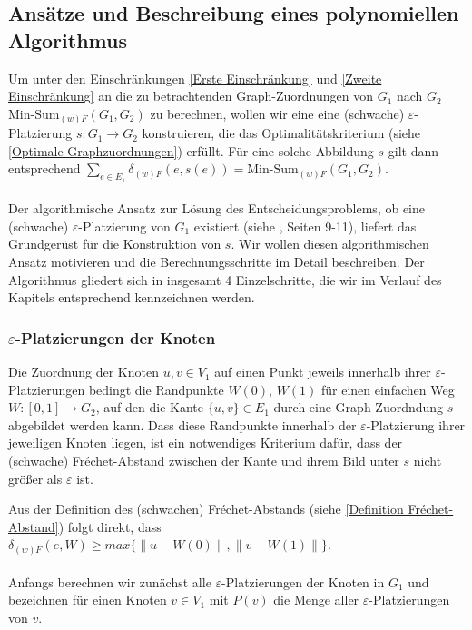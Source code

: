 \documentclass[a4paper, 12pt, twoside]{article}
\theoremstyle{Format1} %
\begin{document}
\subsection{Ansätze und Beschreibung eines polynomiellen Algorithmus} \label{Grundidee des Algorithmus}
Um unter den Einschränkungen \ref{Erste Einschränkung} und \ref{Zweite Einschränkung} an die zu betrachtenden Graph-Zuordnungen von $G_1$ nach $G_2$
Min-Sum$_{(w)F}(G_1,G_2)$ zu berechnen, wollen wir eine
eine (schwache) $\varepsilon$-Platzierung $s: G_1 \to G_2$ konstruieren, die das Optimalitätskriterium (siehe \ref{Optimale Graphzuordnungen}) erfüllt.
Für eine solche Abbildung $s$ gilt dann entsprechend $\sum_{e \in E_1}\delta_{(w)F}(e, s(e)) = \text{Min-Sum}_{(w)F}(G_1,G_2)$.
\\
\\
Der algorithmische Ansatz zur Lösung des Entscheidungsproblems, ob eine (schwache) $\varepsilon$-Platzierung von $G_1$ existiert (siehe \cite{Akitaya},
Seiten 9-11), liefert das Grundgerüst für die Konstruktion von $s$. Wir wollen diesen algorithmischen Ansatz motivieren und die Berechnungsschritte im Detail beschreiben.
Der Algorithmus gliedert sich in insgesamt 4 Einzelschritte, die wir im Verlauf des Kapitels entsprechend kennzeichnen werden.

\subsubsection{$\varepsilon$-Platzierungen der Knoten} \label{Platzierungen der Knoten}
Die Zuordnung der Knoten $u,v \in V_1$ auf einen Punkt jeweils innerhalb ihrer $\varepsilon$-Platzierungen bedingt die Randpunkte $W(0)$, $W(1)$
für einen einfachen Weg $W: [0,1] \to G_2$, auf den die Kante $\{u,v\} \in E_1$ durch eine Graph-Zuordndung $s$ abgebildet werden kann.
Dass diese Randpunkte innerhalb der $\varepsilon$-Platzierung ihrer jeweiligen Knoten liegen, ist ein notwendiges Kriterium dafür, dass der (schwache) Fréchet-Abstand
zwischen der Kante und ihrem Bild unter $s$ nicht größer als $\varepsilon$ ist.

Aus der Definition des (schwachen) Fréchet-Abstands (siehe \ref{Definition Fréchet-Abstand}) folgt direkt, dass
$\delta_{(w)F}(e, W) \geq max{\{\|u-W(0)\|, \|v-W(1)\|\}}$.
\\
\\
Anfangs berechnen wir zunächst alle $\varepsilon$-Platzierungen der Knoten in $G_1$ und bezeichnen für einen Knoten $v \in V_1$ mit $P(v)$ die Menge
aller $\varepsilon$-Platzierungen von $v$.
\end{document}
